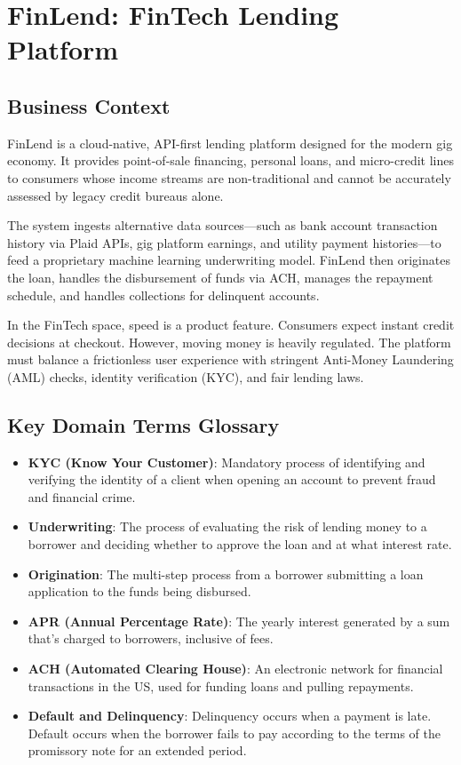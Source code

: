 \bigskip

\section{FinLend: FinTech Lending
Platform}\label{finlend-fintech-lending-platform}

\subsection{Business Context}\label{business-context-1}

FinLend is a cloud-native, API-first lending platform designed for the
modern gig economy. It provides point-of-sale financing, personal loans,
and micro-credit lines to consumers whose income streams are
non-traditional and cannot be accurately assessed by legacy credit
bureaus alone.

The system ingests alternative data sources---such as bank account
transaction history via Plaid APIs, gig platform earnings, and utility
payment histories---to feed a proprietary machine learning underwriting
model. FinLend then originates the loan, handles the disbursement of
funds via ACH, manages the repayment schedule, and handles collections
for delinquent accounts.

In the FinTech space, speed is a product feature. Consumers expect
instant credit decisions at checkout. However, moving money is heavily
regulated. The platform must balance a frictionless user experience with
stringent Anti-Money Laundering (AML) checks, identity verification
(KYC), and fair lending laws.

\subsection{Key Domain Terms
Glossary}\label{key-domain-terms-glossary-1}

\begin{itemize}
\tightlist
\item
  \textbf{KYC (Know Your Customer)}: Mandatory process of identifying
  and verifying the identity of a client when opening an account to
  prevent fraud and financial crime.
\item
  \textbf{Underwriting}: The process of evaluating the risk of lending
  money to a borrower and deciding whether to approve the loan and at
  what interest rate.
\item
  \textbf{Origination}: The multi-step process from a borrower
  submitting a loan application to the funds being disbursed.
\item
  \textbf{APR (Annual Percentage Rate)}: The yearly interest generated
  by a sum that's charged to borrowers, inclusive of fees.
\item
  \textbf{ACH (Automated Clearing House)}: An electronic network for
  financial transactions in the US, used for funding loans and pulling
  repayments.
\item
  \textbf{Default and Delinquency}: Delinquency occurs when a payment is
  late. Default occurs when the borrower fails to pay according to the
  terms of the promissory note for an extended period.
\end{itemize}

